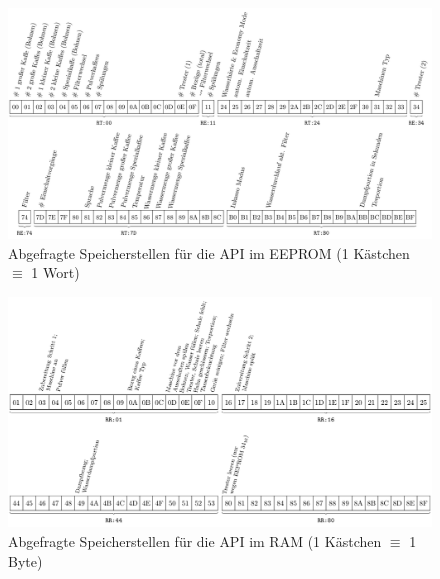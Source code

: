 \begin{figure}
  \begin{center}
    \includegraphics[scale=0.94]{images/chapter_5/API-EEPROM}
    \caption{Abgefragte Speicherstellen für die \ac{API} im \ac{EEPROM} (1 Kästchen $\equiv$ 1 Wort)}
    \label{fig:API-EEPROM}
  \end{center}
\end{figure}
\begin{figure}
  \begin{center}
    \includegraphics[scale=1]{images/chapter_5/API-RAM}
    \caption{Abgefragte Speicherstellen für die \ac{API} im \ac{RAM} (1 Kästchen $\equiv$ 1 Byte)}
    \label{fig:API-RAM}
  \end{center}
\end{figure}
